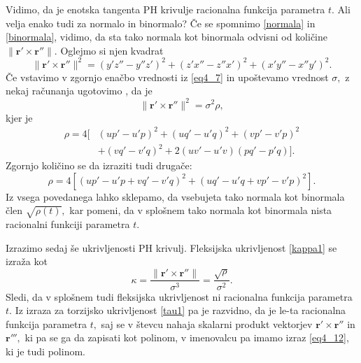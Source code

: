 \documentclass[12pt,a4paper,twoside]{article}
\theoremstyle{definition} %
\theoremstyle{plain} %
\numberwithin{equation}{section}  %
\begin{document}
Vidimo, da je enotska tangenta PH krivulje racionalna funkcija parametra $t.$ Ali velja enako tudi za normalo in binormalo? Če se spomnimo \eqref{normala} in \eqref{binormala}, vidimo, da sta tako normala kot binormala odvisni od količine $\lVert \mathbf{r'} \times \mathbf{r''} \rVert.$ Oglejmo si njen kvadrat
\begin{equation}
	\lVert \mathbf{r'} \times \mathbf{r''} \rVert^2=(y'z''-y''z')^2+(z'x''-z''x')^2+(x'y''-x''y')^2.
\end{equation}
Če vstavimo v zgornjo enačbo vrednosti iz \eqref{eq4_7} in upoštevamo vrednost $\sigma,$ z nekaj računanja ugotovimo \cite{farouki2002exact}, da je
\begin{equation}
	\label{eq4_12}
	\lVert \mathbf{r'} \times \mathbf{r''} \rVert^2=\sigma^2\rho,
\end{equation}
kjer je
\begin{align}
	\rho=4[&(up'-u'p)^2+(uq'-u'q)^2+(vp'-v'p)^2 \nonumber \\
	&+(vq'-v'q)^2+2(uv'-u'v)(pq'-p'q)]. \label{rho1}
\end{align}
Zgornjo količino se da izraziti \cite{beltranmonterde} tudi drugače:
\begin{equation}
	\label{rho2}
	\rho=4[(up'-u'p+vq'-v'q)^2+(uq'-u'q+vp'-v'p)^2].
\end{equation}
Iz vsega povedanega lahko sklepamo, da vsebujeta tako normala kot binormala člen $\sqrt{\rho(t)},$ kar pomeni, da v splošnem tako normala kot binormala nista racionalni funkciji parametra $t.$

Izrazimo sedaj še ukrivljenosti PH krivulj. Fleksijska ukrivljenost \eqref{kappa1} se izraža kot
\begin{equation}
	\label{kappa2}
	\kappa=\frac{\lVert \mathbf{r'} \times \mathbf{r''} \rVert}{\sigma^3}=\frac{\sqrt{\rho}}{\sigma^2}.
\end{equation}
Sledi, da v splošnem tudi fleksijska ukrivljenost ni racionalna funkcija parametra $t.$ Iz izraza za torzijsko ukrivljenost \eqref{tau1} pa je razvidno, da je le-ta racionalna funkcija parametra $t,$ saj se v števcu nahaja skalarni produkt vektorjev $\mathbf{r'}\times \mathbf{r''}$ in $\mathbf{r'''},$ ki pa se ga da zapisati kot polinom, v imenovalcu pa imamo izraz \eqref{eq4_12}, ki je tudi polinom.
\end{document}
